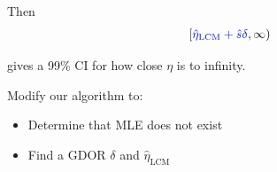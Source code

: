 \documentclass[ 10pt]{beamer}
\newcommand{\etaLCM}{\hat{\eta}_{\textrm{LCM}}}
\begin{document}
{Then %
\begin{align*}
\left [\textcolor{darkblue}{ \etaLCM + \hat{s} \delta}, \infty \right )
\end{align*}

gives a 99\% CI for how close $\eta$ is to infinity.
\vspace{2mm}

\pause
\begin{block}{Modify our algorithm to:}
\begin{itemize}
\item Determine that MLE does not exist
\item Find a GDOR $\delta$ and $\etaLCM$
\end{itemize}
\end{block}
}

%
%
\end{document}
